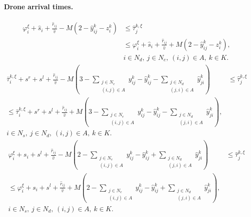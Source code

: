 \documentclass[10pt]{article}
\begin{document}
\paragraph{Drone arrival times.}
\begin{equation}
\begin{aligned}
\varphi_i^\xi+\hat s_i+\frac{\hat r_{ij}}{\hat v}-M(2-\hat y_{ij}^k-z_i^k)
&\leq\hat\tau_j^{k,\xi}\\
&\leq\varphi_i^\xi+\hat s_i+\frac{\hat r_{ij}}{\hat v}+M(2-\hat y_{ij}^k-z_i^k),\\
&i\in N_d,\ j\in N_e,\ (i,j)\in A,\ k\in K.
\end{aligned}\tag{14}
\end{equation}
\begin{equation}
\begin{aligned}
\bar\tau_i^{k,\xi}+s^r+s^l+\frac{\hat r_{ij}}{\hat v}
-M\left(3-\sum_{\substack{j\in N_e\\(i,j)\in A}}y_{ij}^k-\hat y_{ij}^k-\sum_{\substack{j\in N_d\\(j,i)\in A}}\hat y_{ji}^k\right)
&\leq\hat\tau_j^{k,\xi}\\
\leq\bar\tau_i^{k,\xi}+s^r+s^l+\frac{\hat r_{ij}}{\hat v}
+M\left(3-\sum_{\substack{j\in N_e\\(i,j)\in A}}y_{ij}^k-\hat y_{ij}^k-\sum_{\substack{j\in N_d\\(j,i)\in A}}\hat y_{ji}^k\right),&\\
i\in N_s,\ j\in N_d,\ (i,j)\in A,\ k\in K.&
\end{aligned}\tag{15a}
\end{equation}
\begin{equation}
\begin{aligned}
\varphi_i^\xi+s_i+s^l+\frac{\hat r_{ij}}{\hat v}
-M\left(2-\sum_{\substack{j\in N_e\\(i,j)\in A}}y_{ij}^k-\hat y_{ij}^k+\sum_{\substack{j\in N_d\\(j,i)\in A}}\hat y_{ji}^k\right)
&\leq\hat\tau_j^{k,\xi}\\
\leq\varphi_i^\xi+s_i+s^l+\frac{\hat r_{ij}}{\hat v}
+M\left(2-\sum_{\substack{j\in N_e\\(i,j)\in A}}y_{ij}^k-\hat y_{ij}^k+\sum_{\substack{j\in N_d\\(j,i)\in A}}\hat y_{ji}^k\right),&\\
i\in N_s,\ j\in N_d,\ (i,j)\in A,\ k\in K.&
\end{aligned}\tag{15b}
\end{equation}
\end{document}
